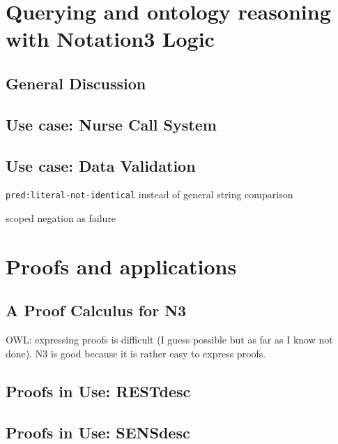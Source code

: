 \documentclass[11pt,a4paper,twoside]{book}
\begin{document}
\chapter{Querying and ontology reasoning with Notation3 Logic}\label{others}
\section{General Discussion}\label{gen}
\section{Use case: Nurse Call System}\label{orca}
%
\section{Use case: Data Validation}
\label{validation}

\texttt{pred:literal-not-identical} instead of general string comparison



scoped negation as failure
\chapter{Proofs and applications}\label{proof}

\section{A Proof Calculus for N3}\label{cal}
OWL: expressing proofs is difficult (I guess possible but as far as I know not done). N3 is good because it is rather  easy to express proofs.
%
%
\section{Proofs in Use: RESTdesc}\label{restdesc}
\section{Proofs in Use: SENSdesc}\label{sensdesc}
\end{document}
